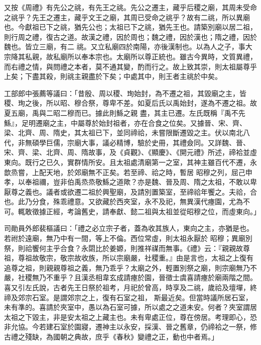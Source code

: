 \begin{pinyinscope}
 又按《周禮》有先公之祧，有先王之祧。先公之遷主，藏乎后稷之廟，其周未受命之祧乎？先王之遷主，藏乎文王之廟，其周已受命之祧乎？故有二祧，所以異廟也。今獻祖已下之祧，猶先公也；太祖已下之祧，猶先王也。請築別廟以居二祖，則行周之禮，復古之道。故漢之禮，因於周也；魏之禮，因於漢也；隋之禮，因於魏也。皆立三廟，有二
 祧。又立私廟四於南陽，亦後漢制也。以為人之子，事大宗降其私親，故私廟所以奉本宗也。太廟所以尊正統也。雖古今異時，文質異禮，而右禮之情，與問禮之本者，莫不通其變，酌而行之。故上致其崇，則太祖屬尊乎上矣；下盡其殺，則祧主親盡於下矣；中處其中，則王者主祧於中矣。



 工部郎中張薦等議曰：「昔殷、周以稷、珣始封，為不遷之祖，其毀廟之主，皆稷、珣之後，所以昭、穆合祭，尊卑不差。如夏后氏以禹始封，遂為不遷之祖。故夏五廟，禹與二昭二穆而已。據此則鯀之親
 盡，其主已遷。左氏既稱『禹不先鯀』，足明遷廟之主，中屬尊於始封祖者，亦在合食之位矣。又據晉、宋、齊、梁、北齊、周、隋史，其太祖已下，並同禘祫，未嘗限斷遷毀之主。伏以南北八代，非無碩學巨儒，宗廟大事，議必精博，驗於史冊，其禮僉同。又詳魏、晉、宋、齊、梁、北齊、周、隋故事，及《貞觀》、《顯慶》、《開元禮》所述，禘袷並虛東向。既行之已久，實群情所安。且太祖處清廟第一之室，其神主雖百代不遷，永歆烝嘗，上配天地，於郊廟無不正矣。若至禘、祫之時，暫居
 昭穆之列，屈己申孝，以奉祖禰，豈非伯禹烝烝敬鯀之道歟？亦是魏、晉及周、隋之太祖，不敢以卑厭尊之義也。議者或欲遷二祖於興聖廟，及請別置築室，至禘祫年饗之。夫祫，合也。此乃分食，殊乖禮意。又欲藏於西夾室，永不及祀，無異漢代瘞園，尤為不可。輒敢徵據正經，考論舊史，請奉獻、懿二祖與太祖並從昭穆之位，而虛東向。」



 司勛員外郎裴樞議曰：「禮之必立宗子者，蓋為收其族人，東向之主，亦猶是也。若祔於遠廟，無乃中有一間，等上不倫。西位常虛，則太祖永厭於
 昭穆；異廟別祭，則祫饗何主乎合食？永閟比於姜嫄，則推祥禖而無事。《禮》云：『親親故尊祖，尊祖故敬宗，敬宗故收族，所以宗廟嚴，社稷重。』由是言也，太祖之上復有追尊之祖，則親親尊祖之義，無乃乖乎？太廟之外，輕置別祭之廟，則宗廟無乃不嚴，社稷無乃不重乎？且漢丞相韋玄成請瘞於園，晉徵士虞喜請瘞於廟兩階之間。喜又引左氏說，古者先王日祭於祖考，月祀於曾高，時享及二祧，歲祫及壇墠，終禘及郊宗石室。是謂郊宗之上，復有石室之祖，
 斯最近矣。但當時議所居石室，未有準的。喜請於夾室中，愚以為石室可據，所以處之之道未安。何者？夾室謂居太祖之下毀主，非是安太祖之上藏主也。未有卑處正位，尊在傍居。考理即心，恐非允協。今若建石室於園寢，遷神主以永安，採漢、晉之舊章，仍禘袷之一祭，修古禮之殘缺，為國朝之典故，庶乎《春秋》變禮之正，動也中者焉。」




\end{pinyinscope}
